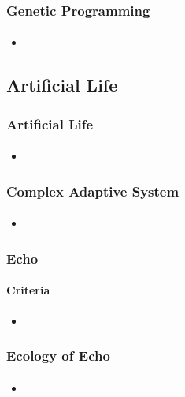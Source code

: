 \frame
{
	\frametitle{Genetic Programming}
	\framesubtitle{}

	\begin{itemize}
		\item 
	\end{itemize}
}

\subsection{Artificial Life}

\frame
{
	\frametitle{Artificial Life}
	\framesubtitle{}

	\begin{itemize}
		\item 
	\end{itemize}
}

\frame
{
	\frametitle{Complex Adaptive System}
	\framesubtitle{}

	\begin{itemize}
		\item 
	\end{itemize}
}

\frame
{
	\frametitle{Echo}
	\framesubtitle{Criteria}

	\begin{itemize}
		\item 
	\end{itemize}
}

\frame
{
	\frametitle{Ecology of Echo}
	\framesubtitle{}

	\begin{itemize}
		\item 
	\end{itemize}
}
